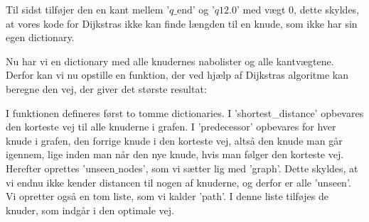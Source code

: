 Til sidst tilføjer den en kant mellem '$q\textrm{\_end}$' og '$q12.0$' med vægt $0$, dette skyldes, at vores kode for Dijkstras ikke kan finde længden til en knude, som ikke har sin egen dictionary.

Nu har vi en dictionary med alle knudernes nabolister og alle kantvægtene. Derfor kan vi nu opstille en funktion, der ved hjælp af Dijkstras algoritme kan beregne den vej, der giver det største resultat:



I funktionen defineres først to tomme dictionaries. I 'shortest\_distance' opbevares den korteste vej til alle knuderne i grafen. I 'predecessor' opbevares for hver knude i grafen, den forrige knude i den korteste vej, altså den knude man går igennem, lige inden man når den nye knude, hvis man følger den korteste vej. Herefter oprettes 'unseen$\_$nodes', som vi sætter lig med 'graph'. Dette skyldes, at vi endnu ikke kender distancen til nogen af knuderne, og derfor er alle 'unseen'. Vi opretter også en tom liste, som vi kalder 'path'. I denne liste tilføjes de knuder, som indgår i den optimale vej.

